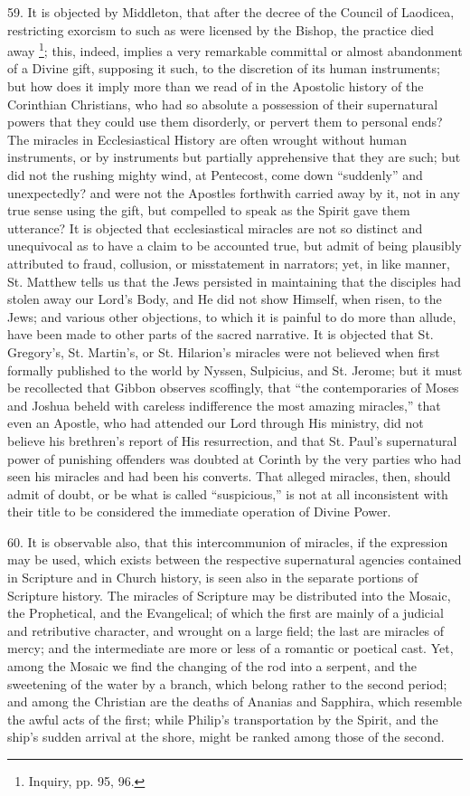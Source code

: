 59.
It is objected by Middleton, that after the decree of the Council of
Laodicea, restricting exorcism to such as were licensed by the Bishop,
the practice died away \footnote{Inquiry, pp. 95, 96.}; this, indeed, implies a very
remarkable committal or almost abandonment of a Divine gift, supposing
it such, to the discretion of its human instruments; but how does it
imply more than we read of in the Apostolic history of the Corinthian
Christians, who had so absolute a possession of their supernatural
powers that they could use them disorderly, or pervert them to
personal ends? The miracles in Ecclesiastical History are often
wrought without human instruments, or by instruments but partially
apprehensive that they are such; but did not the rushing mighty wind,
at Pentecost, come down ``suddenly'' and unexpectedly? and were not the
Apostles forthwith carried away by it, not in any true sense using the
gift, but compelled to speak as the Spirit gave them utterance? It is
objected that ecclesiastical miracles are not so distinct and
unequivocal as to have a claim to be accounted true, but admit of
being plausibly attributed to fraud, collusion, or misstatement in
narrators; yet, in like manner, St. Matthew tells us that the Jews
persisted in maintaining that the disciples had stolen away our
Lord's Body, and He did not show Himself, when risen, to the Jews; and
various other objections, to which it is painful to do more than
allude, have been made to other parts of the sacred narrative. It is
objected that St. Gregory's, St. Martin's, or St. Hilarion's miracles
were not believed when first formally published to the world by Nyssen,
Sulpicius, and St. Jerome; but it must be recollected that Gibbon
observes scoffingly, that ``the contemporaries of Moses and Joshua
beheld with careless indifference the most amazing miracles,'' that
even an Apostle, who had attended our Lord through His ministry, did
not believe his brethren's report of His resurrection, and that St.
Paul's supernatural power of punishing offenders was doubted at
Corinth by the very parties who had seen his miracles and had been his
converts. That alleged miracles, then, should admit of doubt, or be
what is called ``suspicious,'' is not at all inconsistent with their
title to be considered the immediate operation of Divine Power.

60.
It is observable also, that this intercommunion of miracles, if the
expression may be used, which exists between the respective
supernatural agencies contained in Scripture and in Church history, is
seen also in the separate portions of Scripture history. The miracles
of Scripture may be distributed into the Mosaic, the Prophetical, and
the Evangelical; of which the first are mainly of a judicial and
retributive character, and wrought on a large field; the last are
miracles of mercy; and the intermediate are more or less of a romantic
or poetical cast. Yet, among the Mosaic we find the changing of the
rod into a serpent, and the sweetening of the water by a branch, which
belong rather to the second period; and among the Christian are the
deaths of Ananias and Sapphira, which resemble the awful acts of the
first; while Philip's transportation by the Spirit, and the ship's
sudden arrival at the shore, might be ranked among those of the
second.

